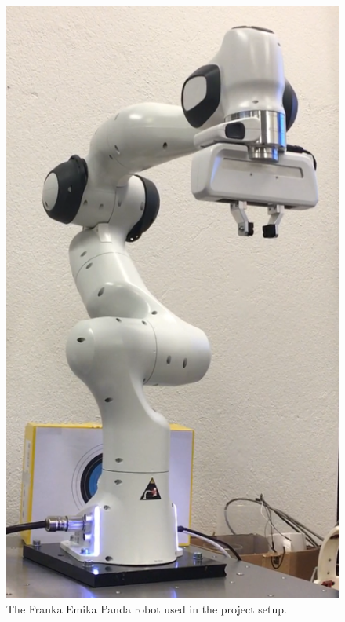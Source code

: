 \documentclass[final]{LTHtwocol} %
\begin{document}
\begin{figure}[t]
	\centering
	\includegraphics[width=0.5\linewidth]{OurFranka.png}
	\caption{The Franka Emika Panda robot used in the project setup.}
	\label{fig:Franka} 
\end{figure}
\end{document}
